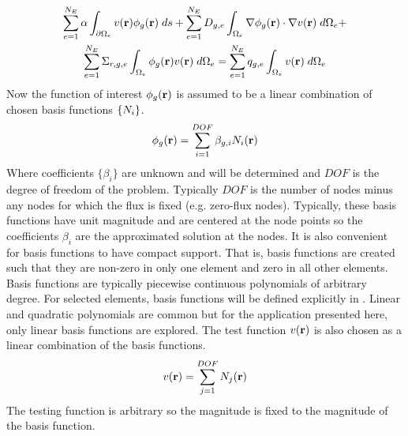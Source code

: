     \begin{multline} \label{eq:element_boundary}
      \sum_{e=1}^{N_E} \alpha \int_{\partial \Omega_e} v(\mathbf{r}) 
        \phi_g(\mathbf{r}) \;ds + \sum_{e=1}^{N_E} D_{g,e}
        \int_{\Omega_e} \mathbf{\nabla} \phi_g(\mathbf{r}) \cdot \mathbf{\nabla} v(\mathbf{r}) \; d\Omega_e + \\
        \sum_{e=1}^{N_E} \Sigma_{r,g,e} \int_{\Omega_e} \phi_g(\mathbf{r}) v(\mathbf{r}) 
        \; d\Omega_e =
        \sum_{e=1}^{N_E} q_{g,e} \int_{\Omega_e} v(\mathbf{r}) \; d\Omega_e
    \end{multline}
    Now the function of interest $\phi_g(\mathbf{r})$ is assumed to be a linear 
    combination of chosen basis functions $\{N_i\}$.
    \begin{equation} \label{eq:linear_combination}
      \phi_g(\mathbf{r}) = \sum_{i=1}^{DOF} \beta_{g,i} N_i(\mathbf{r})
    \end{equation}
    Where coefficients $\{\beta_i\}$ are unknown and will be determined and $DOF$
    is the degree of freedom of the problem. Typically $DOF$ is the number of
    nodes minus any nodes for which the flux is fixed (e.g. zero-flux nodes).
    Typically, these basis functions have unit magnitude and are centered at the
    node  points so the coefficients $\beta_i$ are the approximated solution at
    the nodes. It is also convenient for basis functions to have compact
    support. That is, basis functions are created such that they are non-zero in
    only one element and zero in all other elements.
    Basis functions are typically piecewise continuous polynomials of arbitrary 
    degree. For selected elements, basis functions will be defined explicitly in
    .
    Linear and quadratic polynomials are common but for the application 
    presented here, only linear basis functions are explored.
    The test function $v(\mathbf{r})$ is also chosen as a linear combination of the 
    basis functions.
    \begin{equation} \label{eq:linear_superposition}
      v(\mathbf{r}) = \sum_{j=1}^{DOF} N_j(\mathbf{r})
    \end{equation}
    The testing function is arbitrary so the magnitude is fixed to the magnitude
    of the basis function.
    
